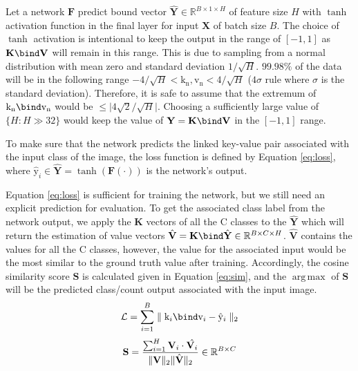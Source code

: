 \documentclass[letterpaper]{article} %
\DeclarePairedDelimiter{\norm}{\lVert}{\rVert}
\DeclareMathOperator*{\argmax}{arg\,max}
\begin{document}
Let a network $\mathbf{F}$ predict bound vector $\hat{\mathbf{Y}} \in \mathbb{R}^{B \times 1 \times H}$ of feature size $H$ with $\tanh$ activation function in the final layer for input $\mathbf{X}$ of batch size $B$. The choice of $\tanh$ activation is intentional to keep the output in the range of $[-1, 1]$ as $\mathbf{K} \bind \mathbf{V}$ will remain in this range. This is due to sampling from a normal distribution with mean zero and standard deviation $1/\sqrt{H}$. $99.98\%$ of the data will be in the following range $-4/\sqrt{H} < \mathrm{k}_\mathrm{n}, \mathrm{v}_\mathrm{n} < 4/\sqrt{H}$ ($4\sigma$ rule where $\sigma$ is the standard deviation). Therefore, it is safe to assume that the extremum of $\mathrm{k}_\mathrm{n} \bind \mathrm{v}_\mathrm{n}$ would be $\leq \lvert 4\sqrt{2}/\sqrt{H} \rvert$. Choosing a sufficiently large value of $\{H:H\gg32\}$ would keep the value of $\mathbf{Y}=\mathbf{K} \bind \mathbf{V}$ in the $[-1, 1]$ range.
\par 
To make sure that the network predicts the linked key-value pair associated with the input class of the image, the loss function is defined by Equation \ref{eq:loss}, where $\hat{\mathrm{y}}_i \in \hat{\mathbf{Y}} = \tanh(\mathbf{F}(\cdot))$ is the network's output.

Equation \ref{eq:loss} is sufficient for training the network, but we still need an explicit prediction for evaluation. To get the associated class label from the network output, we apply the $\mathbf{K}$ vectors of all the $\mathrm{C}$ classes to the $\hat{\mathbf{Y}}$ which will return the estimation of value vectors 
$\hat{\mathbf{V}} = \mathbf{K} \bind \hat{\mathbf{Y}} \in \mathbb{R}^{B \times C \times H}$.
$\hat{\mathbf{V}}$ contains the values for all the $\mathrm{C}$ classes, however, the value for the associated input would be the most similar to the ground truth value after training. Accordingly, the cosine similarity score $\mathbf{S}$ is calculated given in Equation \ref{eq:sim}, and the $\argmax$ of $\mathbf{S}$ will be the predicted class/count output associated with the input image.
\begin{equation}
\mathcal{L} = \sum_{i=1}^{B} \; \norm{\; \mathrm{k}_i \bind \mathrm{v}_i - \hat{\mathrm{y}}_i \;}_2
\label{eq:loss}
\end{equation}
\begin{equation}
\mathbf{S} = \frac{\sum_{i=1}^{H} \mathbf{V}_{i} \cdot \hat{\mathbf{V}_{i}}}{\norm{\mathbf{V}}_2 \norm{\hat{\mathbf{V}}}_2} \in \mathbb{R}^{B \times C}
\label{eq:sim}
\end{equation}
\end{document}
